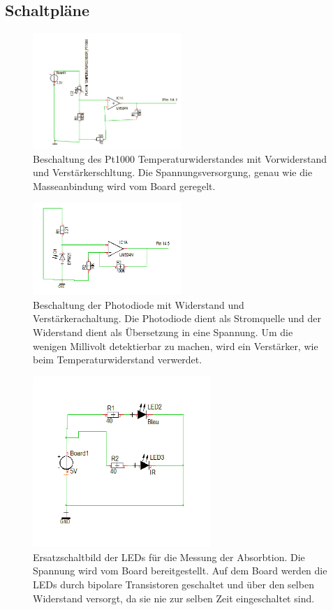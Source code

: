 \documentclass[12pt,a4paper,titlepage,headinclude,bibtotoc]{scrartcl}
\numberwithin{equation}{subsection}
\begin{document}
\subsection{Schaltpläne}
\begin{figure}[!h]
\centering
\includegraphics[width=0.5\textwidth]{Fotos/PT1000Schaltung.png}
\caption{Beschaltung des Pt1000 Temperaturwiderstandes mit Vorwiderstand und Verstärkerschltung. Die Spannungsversorgung, genau wie die Masseanbindung wird vom Board geregelt.}
\label{fig:PT1000Schaltung}
\end{figure}
\begin{figure}[!h]
\centering
\includegraphics[width=0.5\textwidth]{Fotos/PhotodiodeSchaltung.png}
\caption{Beschaltung der Photodiode mit Widerstand und Verstärkerachaltung. Die Photodiode dient als Stromquelle und der Widerstand dient als Übersetzung in eine Spannung. Um die wenigen Millivolt detektierbar zu machen, wird ein Verstärker, wie beim Temperaturwiderstand verwerdet.}
\label{fig:PhotodiodeSchaltung}
\end{figure}
\begin{figure}[!h]
\centering
\includegraphics[width=0.6\textwidth]{Fotos/LEDSchaltung.png}
\caption{Ersatzschaltbild der LEDs für die Messung der Absorbtion. Die Spannung wird vom Board bereitgestellt. Auf dem Board werden die LEDs durch bipolare Transistoren geschaltet und über den selben Widerstand versorgt, da sie nie zur selben Zeit eingeschaltet sind.}
\label{fig:LEDSchaltung}
\end{figure}
\end{document}
